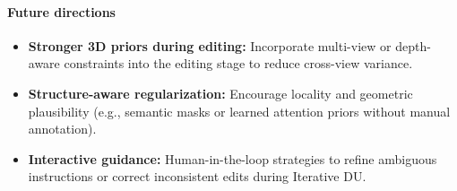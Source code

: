 \begin{enrichment}
\begin{enrichment}
        \paragraph{Future directions}
        \begin{itemize}
            \item \textbf{Stronger 3D priors during editing:} \; Incorporate multi-view or depth-aware constraints into the editing stage to reduce cross-view variance.
            \item \textbf{Structure-aware regularization:} \; Encourage locality and geometric plausibility (e.g., semantic masks or learned attention priors without manual annotation).
            \item \textbf{Interactive guidance:} \; Human-in-the-loop strategies to refine ambiguous instructions or correct inconsistent edits during Iterative DU.
        \end{itemize}
        
    \end{enrichment}
        
\end{enrichment}

\newpage

